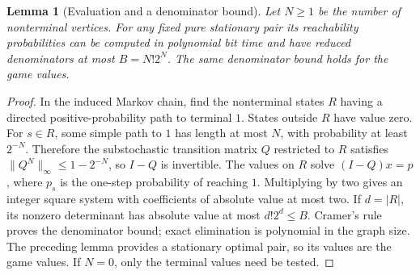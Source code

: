 \documentclass[11pt]{article}
\newtheorem{lemma}[theorem]{Lemma}
\theoremstyle{definition}
\begin{document}
\begin{lemma}[Evaluation and a denominator bound]
Let $N\geq1$ be the number of nonterminal vertices. For any fixed pure
stationary pair its reachability probabilities can be computed in polynomial
bit time and have reduced denominators at most $B=N!2^N$. The same denominator
bound holds for the game values.
\end{lemma}
\begin{proof}
In the induced Markov chain, find the nonterminal states $R$ having a directed
positive-probability path to terminal $1$. States outside $R$ have value zero.
For $s\in R$, some simple path to $1$ has length at most $N$, with probability
at least $2^{-N}$. Therefore the substochastic transition matrix $Q$ restricted
to $R$ satisfies $\|Q^N\|_\infty\leq1-2^{-N}$, so $I-Q$ is invertible.
The values on $R$ solve $(I-Q)x=p$, where $p_s$ is the one-step probability
of reaching $1$. Multiplying by two gives an integer square system with
coefficients of absolute value at most two. If $d=|R|$, its nonzero determinant
has absolute value at most $d!2^d\leq B$. Cramer's rule proves the denominator
bound; exact elimination is polynomial in the graph size. The preceding lemma
provides a stationary optimal pair, so its values are the game values.
If $N=0$, only the terminal values need be tested.
\end{proof}
\end{document}

